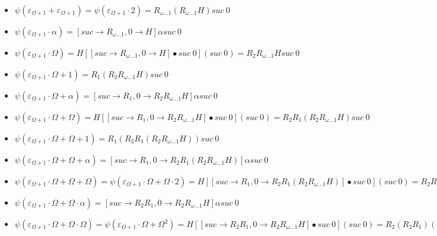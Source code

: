 \documentclass[10pt]{article}
\begin{document}
\begin{itemize}
\item \( \psi(\varepsilon_{\Omega+1}+\varepsilon_{\Omega+1}) = \psi(\varepsilon_{\Omega+1} \cdot 2) = R_{\omega \ldots 1} (R_{\omega \ldots 1} H) suc\ 0 \)

\item \( \psi(\varepsilon_{\Omega+1} \cdot \alpha) = [suc \rightarrow R_{\omega \ldots 1}, 0 \rightarrow H] \alpha suc\ 0 \)

\item \( \psi(\varepsilon_{\Omega+1} \cdot \Omega) = H [[suc \rightarrow R_{\omega \ldots 1}, 0 \rightarrow H] \bullet suc\ 0] (suc\ 0) = R_2 R_{\omega \ldots 1} H suc\ 0 \)


\item \( \psi(\varepsilon_{\Omega+1} \cdot \Omega+1) = R_1 (R_2 R_{\omega \ldots 1} H) suc\ 0 \)

\item \( \psi(\varepsilon_{\Omega+1} \cdot \Omega+\alpha) = [suc \rightarrow R_1, 0 \rightarrow R_2 R_{\omega \ldots 1} H] \alpha suc\ 0 \)

\item \( \psi(\varepsilon_{\Omega+1} \cdot \Omega+\Omega) = H [[suc \rightarrow R_1, 0 \rightarrow R_2 R_{\omega \ldots 1} H] \bullet suc\ 0] (suc\ 0) = R_2 R_1 (R_2 R_{\omega \ldots 1} H) suc\ 0 \)

\item \( \psi(\varepsilon_{\Omega+1} \cdot \Omega+\Omega+1) = R_1 (R_2 R_1 (R_2 R_{\omega \ldots 1} H)) suc\ 0 \)

\item \( \psi(\varepsilon_{\Omega+1} \cdot \Omega+\Omega+\alpha) = [suc \rightarrow R_1, 0 \rightarrow R_2 R_1 (R_2 R_{\omega \ldots 1} H)] \alpha suc\ 0 \)

\item \( \psi(\varepsilon_{\Omega+1} \cdot \Omega+\Omega+\Omega) = \psi(\varepsilon_{\Omega+1} \cdot \Omega+\Omega \cdot 2) = H [[suc \rightarrow R_1, 0 \rightarrow R_2 R_1 (R_2 R_{\omega \ldots 1} H)] \bullet suc\ 0] (suc\ 0) = R_2 R_1 (R_2 R_1 (R_2 R_{\omega \ldots 1} H)) suc\ 0 \)

\item \( \psi(\varepsilon_{\Omega+1} \cdot \Omega+\Omega \cdot \alpha) = [suc \rightarrow R_2 R_1, 0 \rightarrow R_2 R_{\omega \ldots 1} H] \alpha suc\ 0 \)

\item \( \psi(\varepsilon_{\Omega+1} \cdot \Omega+\Omega \cdot \Omega) = \psi(\varepsilon_{\Omega+1} \cdot \Omega+\Omega^2) = H [[suc \rightarrow R_2 R_1, 0 \rightarrow R_2 R_{\omega \ldots 1} H] \bullet suc\ 0] (suc\ 0) = R_2 (R_2 R_1) (R_2 R_{\omega \ldots 1} H) suc\ 0 \)


\end{itemize}
\end{document}
